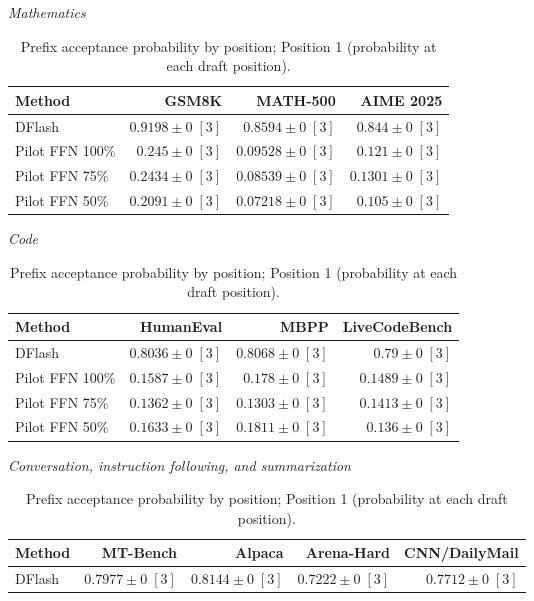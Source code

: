 \begin{table}[!htp]
\centering\small
\setlength{\tabcolsep}{3pt}
\caption{Prefix acceptance probability by position; Position 1 (probability at each draft position).}
\label{tab:appendix-metric-prefix-survival-1}
\textit{Mathematics}\par\smallskip
\begin{tabular}{@{}>{\raggedright\arraybackslash}p{3.7cm}rrr@{}}
\toprule
Method & GSM8K & MATH-500 & AIME 2025 \\
\midrule
DFlash & \(\mathbf{0.9198} \pm 0\;[3]\) & \(\mathbf{0.8594} \pm 0\;[3]\) & \(\mathbf{0.844} \pm 0\;[3]\) \\
Pilot FFN 100\% & \(0.245 \pm 0\;[3]\) & \(0.09528 \pm 0\;[3]\) & \(0.121 \pm 0\;[3]\) \\
Pilot FFN 75\% & \(0.2434 \pm 0\;[3]\) & \(0.08539 \pm 0\;[3]\) & \(0.1301 \pm 0\;[3]\) \\
Pilot FFN 50\% & \(0.2091 \pm 0\;[3]\) & \(0.07218 \pm 0\;[3]\) & \(0.105 \pm 0\;[3]\) \\
\bottomrule
\end{tabular}\par\medskip
\textit{Code}\par\smallskip
\begin{tabular}{@{}>{\raggedright\arraybackslash}p{3.7cm}rrr@{}}
\toprule
Method & HumanEval & MBPP & LiveCodeBench \\
\midrule
DFlash & \(\mathbf{0.8036} \pm 0\;[3]\) & \(\mathbf{0.8068} \pm 0\;[3]\) & \(\mathbf{0.79} \pm 0\;[3]\) \\
Pilot FFN 100\% & \(0.1587 \pm 0\;[3]\) & \(0.178 \pm 0\;[3]\) & \(0.1489 \pm 0\;[3]\) \\
Pilot FFN 75\% & \(0.1362 \pm 0\;[3]\) & \(0.1303 \pm 0\;[3]\) & \(0.1413 \pm 0\;[3]\) \\
Pilot FFN 50\% & \(0.1633 \pm 0\;[3]\) & \(0.1811 \pm 0\;[3]\) & \(0.136 \pm 0\;[3]\) \\
\bottomrule
\end{tabular}\par\medskip
\textit{Conversation, instruction following, and summarization}\par\smallskip
\begin{tabular}{@{}>{\raggedright\arraybackslash}p{3.7cm}rrrr@{}}
\toprule
Method & MT-Bench & Alpaca & Arena-Hard & CNN/DailyMail \\
\midrule
DFlash & \(\mathbf{0.7977} \pm 0\;[3]\) & \(\mathbf{0.8144} \pm 0\;[3]\) & \(\mathbf{0.7222} \pm 0\;[3]\) & \(\mathbf{0.7712} \pm 0\;[3]\) \\

\end{tabular}
\end{table}
